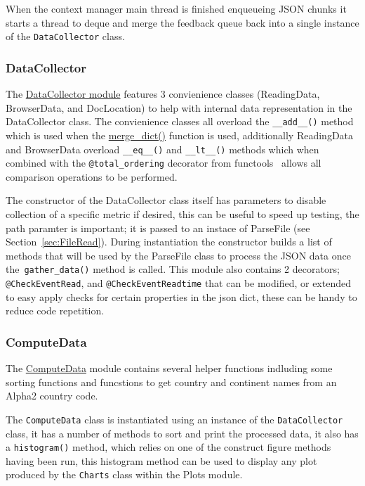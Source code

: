 \documentclass[11pt]{article}
\newcommand{\code}[1]{\colorbox{light-gray}{\texttt{#1}}}
\begin{document}
When the context manager main thread is finished enqueueing JSON chunks it starts a thread to deque and merge the feedback queue back into a single instance of the \code{DataCollector} class.

\subsubsection{DataCollector}
The \href{https://www2.macs.hw.ac.uk/~sf52/DocuTrace/html/DocuTrace.Analysis.html#module-DocuTrace.Analysis.DataCollector}{DataCollector module} features 3 convienience classes (ReadingData, BrowserData, and DocLocation) to help with internal data representation in the DataCollector class. The convienience classes all overload the \code{\_\_add\_\_()} method which is used when the \href{https://www2.macs.hw.ac.uk/~sf52/DocuTrace/html/DocuTrace.Analysis.html#DocuTrace.Analysis.DataCollector.merge_dict}{merge\_dict()} function is used, additionally ReadingData and BrowserData overload \code{\_\_eq\_\_()} and \code{\_\_lt\_\_()} methods which when combined with the \code{@total\_ordering} decorator from functools~\autocite{FunctoolsHigherorderFunctions} allows all comparison operations to be performed.

The constructor of the DataCollector class itself has parameters to disable collection of a specific metric if desired, this can be useful to speed up testing, the path paramter is important; it is passed to an instace of ParseFile (see Section~\ref{sec:FileRead}). During instantiation the constructor builds a list of methods that will be used by the ParseFile class to process the JSON data once the~\code{gather\_data()} method is called.
This module also contains 2 decorators; \code{@CheckEventRead}, and \code{@CheckEventReadtime} that can be modified, or extended to easy apply checks for certain properties in the json dict, these can be handy to reduce code repetition.


\subsubsection{ComputeData}\label{subsec:ComputeData}
The \href{https://www2.macs.hw.ac.uk/~sf52/DocuTrace/html/DocuTrace.Analysis.html#module-DocuTrace.Analysis.ComputeData}{ComputeData} module contains several helper functions indluding some sorting functions and funcstions to get country and continent names from an Alpha2 country code.

The \code{ComputeData} class is instantiated using an instance of the \code{DataCollector} class, it has a number of methods to sort and print the processed data, it also has a \code{histogram()} method, which relies on one of the construct figure methods having been run, this histogram method can be used to display any plot produced by the \code{Charts} class within the Plots module.
\end{document}
